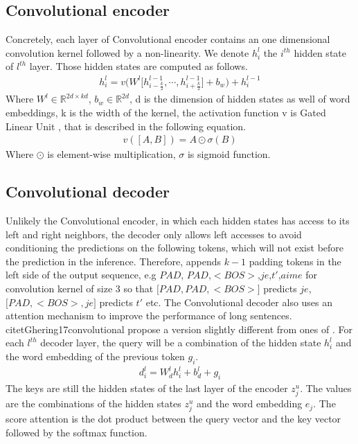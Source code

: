 \subsection{Convolutional encoder}
Concretely, each layer of Convolutional encoder contains an one dimensional convolution kernel followed by a non-linearity. We denote $h^l_i$ the $i^{th}$ hidden state of $l^{th}$ layer. Those hidden states are computed as follows.
\begin{equation}
\begin{array}{lcr}
h^l_i = v\bigg( W^l \big[h^{l-1}_{i-\frac{k}{2}}, \cdots, h^{l-1}_{i+\frac{k}{2}} \big] + b_w \bigg) + h^{l-1}_{i}
\end{array}
\end{equation}
Where $W^l \in \mathbb{R}^{2d \times kd}$, $b_w \in \mathbb{R}^{2d}$, d is the dimension of hidden states as well of word embeddings, k is the width of the kernel, the activation function v is Gated Linear Unit \citep{Ghering17convolutional}, that is described in the following equation.
\begin{equation}
\begin{array}{lcr}
v([A,B]) = A \odot \sigma(B)
\end{array}
\end{equation}
Where $\odot$ is element-wise multiplication, $\sigma$ is sigmoid function.
\subsection{Convolutional decoder}
Unlikely the Convolutional encoder, in which each hidden states has access to its left and right neighbors, the decoder only allows left accesses to avoid conditioning the predictions on the following tokens, which will not exist before the prediction in the inference. Therefore, \citet{Ghering17convolutional} appends $k-1$ padding tokens in the left side of the output sequence, e.g $PAD$, $PAD$,$ <BOS>$,$je$,$t'$,$aime$ for convolution kernel of size 3 so that $\big[ PAD, PAD, <BOS>\big]$ predicts $je$, $\big[ PAD,<BOS>,je\big]$ predicts $t'$ etc.
The Convolutional decoder also uses an attention mechanism to improve the performance of long sentences. \\citet{Ghering17convolutional} propose a version slightly different from ones of \citet{Luong15stanford, Bahdanau15learning}. For each $l^{th}$ decoder layer, the query will be a combination of the hidden state $h^l_i$ and the word embedding of the previous token $g_i$.
\begin{equation}
\begin{array}{rcl}
d^l_i = W^l_d h^l_i + b^l_d + g_i
\end{array}
\end{equation}
The keys are still the hidden states of the last layer of the encoder $z^u_j$. The values are the combinations of the hidden states $z^u_j$ and the word embedding $e_j$. The score attention is the dot product between the query vector and the key vector followed by the softmax function.
